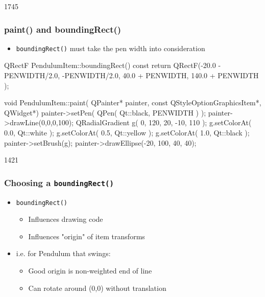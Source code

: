 \begin{slide}[fragile]{1745}
\frametitle{paint() and boundingRect()}
\begin{itemize}
\item \texttt{boundingRect()} must take the pen width into consideration
\end{itemize}
\begin{cpp}
QRectF PendulumItem::boundingRect() const {
    return QRectF(-20.0 - PENWIDTH/2.0, -PENWIDTH/2.0,
                  40.0 + PENWIDTH, 140.0 + PENWIDTH );
}

void PendulumItem::paint( QPainter* painter,
    const QStyleOptionGraphicsItem*, QWidget*) {
    painter->setPen( QPen( Qt::black, PENWIDTH ) );
    painter->drawLine(0,0,0,100);
    QRadialGradient g( 0, 120, 20, -10, 110 );
    g.setColorAt( 0.0, Qt::white );
    g.setColorAt( 0.5, Qt::yellow );
    g.setColorAt( 1.0, Qt::black );
    painter->setBrush(g);
    painter->drawEllipse(-20, 100, 40, 40);
}
\end{cpp}
\end{slide}

\begin{slide}{1421}
\frametitle{Choosing a \texttt{boundingRect()}}
\begin{itemize}
\item \texttt{boundingRect()} 
    \begin{itemize}
    \item Influences drawing code
    \item Influences "origin" of item transforms
    \end{itemize}
\item i.e. for Pendulum that swings:
    \begin{itemize}
    \item Good origin is non-weighted end of line
    \item Can rotate around (0,0) without translation 
    \end{itemize}
\end{itemize}

\end{slide}

